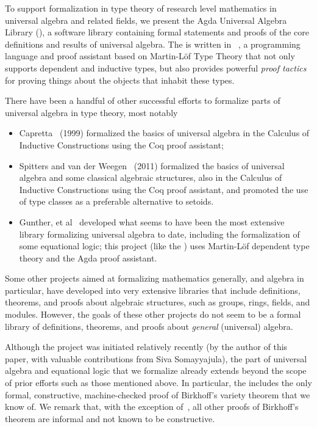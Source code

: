 To support formalization in type theory of research level mathematics in universal algebra and related fields, we present the Agda Universal Algebra Library (\agdaualib), a software library containing formal statements and proofs of the core definitions and results of universal algebra. 
The \agdaualib is written in \agda~\cite{Norell:2009}, a programming language and proof assistant based on Martin-L\"of Type Theory that not only supports dependent and inductive types, but also provides powerful \emph{proof tactics} for proving things about the objects that inhabit these types.

There have been a handful of other successful efforts to formalize parts of universal algebra in type theory, most notably
\begin{itemize}
  \item Capretta~\cite{Capretta:1999} (1999) formalized the basics of universal algebra in the Calculus of Inductive Constructions using the Coq proof assistant;
    \item Spitters and van der Weegen~\cite{Spitters:2011} (2011) formalized the basics of universal algebra and some classical algebraic structures, also in the Calculus of Inductive Constructions using the Coq proof assistant, and promoted the use of type classes as a preferable alternative to setoids.
 \item Gunther, et al~\cite{Gunther:2018} developed what seems to have been the most extensive library formalizing universal algebra to date, including the formalization of some equational logic; this project (like the \ualib) uses Martin-L\"of dependent type theory and the Agda proof assistant.
\end{itemize}
Some other projects aimed at formalizing mathematics generally, and algebra in particular, have developed into very extensive libraries that include definitions, theorems, and proofs about algebraic structures, such as groups, rings, fields, and modules.  However, the goals of these other projects do not seem to be a formal library of definitions, theorems, and proofs about \textit{general} (universal) algebra.

Although the \ualib project was initiated relatively recently (by the author of this paper, with valuable contributions from Siva Somayyajula), the part of universal algebra and equational logic that we formalize already extends beyond the scope of prior efforts such as those mentioned above.  In particular, the \ualib includes the only formal, constructive, machine-checked proof of Birkhoff's variety theorem that we know of. We remark that, with the exception of~\cite{Carlstrom:2008}, all other proofs of Birkhoff's theorem are informal and not known to be constructive.

